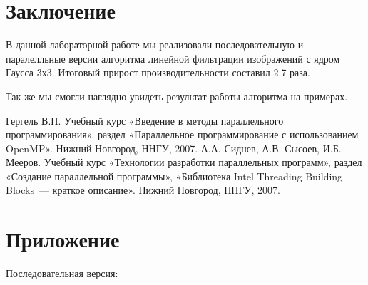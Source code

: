 \documentclass{report}
\begin{document}
\begin{figure}[H]
    \centering
    \qquad
\end{figure}
 


\newpage

\section*{Заключение}

В данной лабораторной работе мы реализовали последовательную и паралелльные версии алгоритма линейной фильтрации изображений с ядром Гаусса 3х3. Итоговый прирост производительности составил 2.7 раза.

Так же мы смогли наглядно увидеть результат работы алгоритма на примерах.

\newpage

\begin{thebibliography}{1}
 Гергель В.П. Учебный курс «Введение в методы параллельного программирования», раздел «Параллельное программирование с использованием OpenMP». Нижний Новгород, ННГУ, 2007.
 А.А. Сиднев, А.В. Сысоев, И.Б. Мееров. Учебный курс «Технологии разработки параллельных программ», раздел «Создание параллельной программы», «Библиотека Intel Threading Building Blocks~--- краткое описание». Нижний Новгород, ННГУ, 2007. 
\end{thebibliography}

\newpage

\section*{Приложение}


Последовательная версия:
\end{document}

